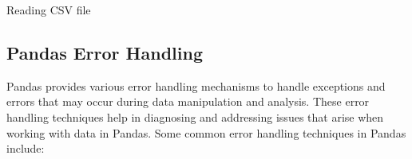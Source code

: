		\begin{code}[h!]
		    
		
		\caption{Reading CSV file }
		
		\end{code}

	\subsection{Pandas Error Handling}
	
	Pandas provides various error handling mechanisms to handle exceptions and errors that may occur during data manipulation and analysis. These error handling techniques help in diagnosing and addressing issues that arise when working with data in Pandas. Some common error handling techniques in Pandas include:
	

